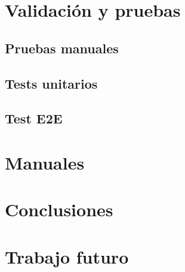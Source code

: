 \documentclass[12pt]{report} %
\begin{document}
\chapter{Validación y pruebas}

\section{Pruebas manuales}

\section{Tests unitarios}

\section{Test E2E}

\chapter{Manuales}

\chapter{Conclusiones}

\chapter{Trabajo futuro}




\end{document}

